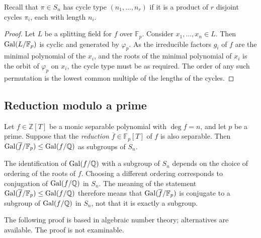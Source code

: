 Recall that \( \pi \in S_n \) has cycle type \( (n_1, \dots, n_r) \) if it is a product of \( r \) disjoint cycles \( \pi_i \), each with length \( n_i \).
\begin{proof}
	Let \( L \) be a splitting field for \( f \) over \( \mathbb F_p \).
	Consider \( x_1, \dots, x_n \in L \).
	Then \( \operatorname{Gal}(L/\mathbb F_p) \) is cyclic and generated by \( \varphi_p \).
	As the irreducible factors \( g_i \) of \( f \) are the minimal polynomial of the \( x_i \), and the roots of the minimal polynomial of \( x_i \) is the orbit of \( \varphi_p \) on \( x_i \), the cycle type must be as required.
	The order of any such permutation is the lowest common multiple of the lengths of the cycles.
\end{proof}

\subsection{Reduction modulo a prime}
\begin{theorem}
	Let \( f \in \mathbb Z[T] \) be a monic separable polynomial with \( \deg f = n \), and let \( p \) be a prime.
	Suppose that the \emph{reduction} \( \overline f \in \mathbb F_p[T] \) of \( f \) is also separable.
	Then \( \operatorname{Gal}(\overline f / \mathbb F_p) \leq \operatorname{Gal}(f/\mathbb Q) \) as subgroups of \( S_n \).
\end{theorem}
\begin{remark}
	The identification of \( \operatorname{Gal}(f/\mathbb Q) \) with a subgroup of \( S_n \) depends on the choice of ordering of the roots of \( f \).
	Choosing a different ordering corresponds to conjugation of \( \operatorname{Gal}(f/\mathbb Q) \) in \( S_n \).
	The meaning of the statement \( \operatorname{Gal}(\overline f/\mathbb F_p) \leq \operatorname{Gal}(f/\mathbb Q) \) therefore means that \( \operatorname{Gal}(\overline f/\mathbb F_p) \) is conjugate to a subgroup of \( \operatorname{Gal}(f/\mathbb Q) \) in \( S_n \), not that it is exactly a subgroup.
\end{remark}
The following proof is based in algebraic number theory; alternatives are available.
The proof is not examinable.
